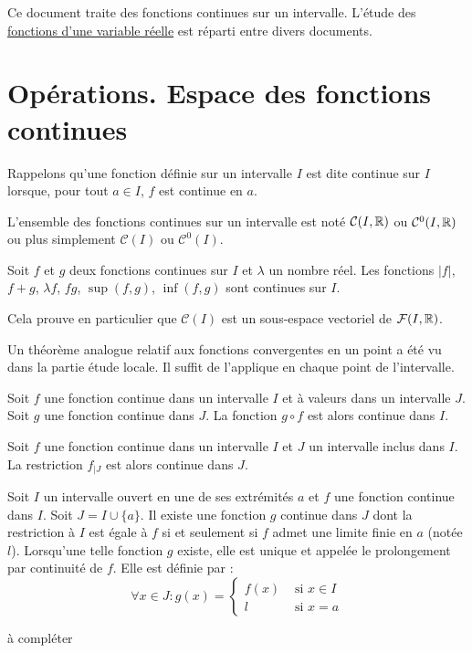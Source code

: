 


Ce document traite des fonctions continues sur un intervalle. L'étude des \href{\baseurl C2063.pdf}{fonctions d'une variable réelle} est réparti entre divers documents.
\section{Opérations. Espace des fonctions continues}
Rappelons qu'une fonction définie sur un intervalle $I$ est dite continue sur $I$ lorsque, pour tout $a\in I$, $f$ est continue en $a$.
\begin{nota}
 L'ensemble des fonctions continues sur un intervalle est noté $\mathcal C (I,\mathbb{R})$ ou $\mathcal C^0 (I,\mathbb{R})$ ou plus simplement $\mathcal C (I)$ ou $\mathcal C^0 (I)$. 
\end{nota}
\begin{prop}
 Soit $f$ et $g$ deux fonctions continues sur $I$ et $\lambda$ un nombre réel. Les fonctions $|f|$, $f+g$, $\lambda f$, $fg$, $\sup(f,g)$, $\inf(f,g)$ sont continues sur $I$.
\end{prop}
\begin{rem}
 Cela prouve en particulier que $\mathcal C (I)$ est un sous-espace vectoriel de $\mathcal F(I,\mathbb{R})$. 
\end{rem}
\begin{demo}
 Un théorème analogue relatif aux fonctions convergentes en un point a été vu dans la partie étude locale. Il suffit de l'applique en chaque point de l'intervalle.
\end{demo}
\begin{prop}
 Soit $f$ une fonction continue dans un intervalle $I$ et  à valeurs dans un intervalle $J$. Soit $g$ une fonction continue dans $J$. La fonction $g\circ f$ est alors continue dans $I$.
\end{prop}
\begin{prop}
 Soit $f$ une fonction continue dans un intervalle $I$ et $J$ un intervalle inclus dans $I$. La restriction $f_{|J}$ est alors continue dans $J$.
\end{prop}
\begin{prop}
 Soit $I$ un intervalle ouvert en une de ses extrémités $a$ et $f$ une fonction continue dans $I$. Soit $J = I\cup\{a\}$. Il existe une fonction $g$ continue dans $J$ dont la restriction à $I$ est égale à $f$ si et seulement si $f$ admet une limite finie en $a$ (notée $l$).\newline
Lorsqu'une telle fonction $g$ existe, elle est unique et appelée le prolongement par continuité de $f$. Elle est définie par :
\begin{displaymath}
 \forall x\in J : g(x)=\left\lbrace 
\begin{aligned}
 f(x) &\text{ si } x\in I \\
 l &\text{ si } x=a
\end{aligned}
\right. 
\end{displaymath}
\end{prop}
\begin{demo}
 à compléter
\end{demo}


